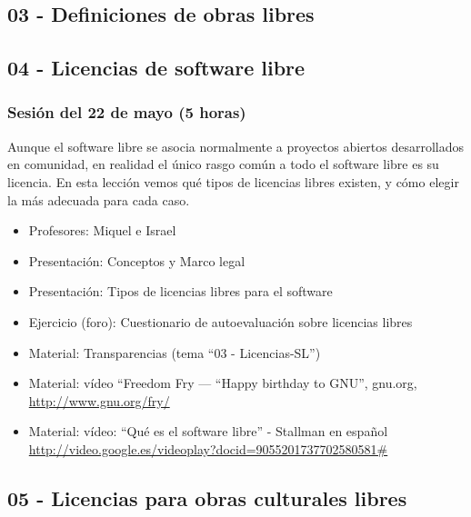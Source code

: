 \documentclass[a4paper,12pt]{article}
\begin{document}
\subsection{03 - Definiciones de obras libres}

\subsection{04 - Licencias de software libre}

\subsubsection{Sesión del 22 de mayo (5 horas)}

Aunque el software libre se asocia normalmente a proyectos abiertos desarrollados en comunidad, en realidad el único rasgo común a todo el software libre es su licencia. En esta lección vemos qué tipos de licencias libres existen, y cómo elegir la más adecuada para cada caso. 

 \begin{itemize}
 \item Profesores: Miquel e Israel
 \item Presentación: Conceptos y Marco legal 
 \item Presentación: Tipos de licencias libres para el software 
 \item Ejercicio (foro): Cuestionario de autoevaluación sobre licencias libres \\
 \item Material: Transparencias (tema ``03 - Licencias-SL'')
 \item Material: vídeo ``Freedom Fry — “Happy birthday to GNU'', gnu.org, \\
   \url{http://www.gnu.org/fry/}
 \item Material: vídeo: ``Qué es el software libre'' - Stallman en español
\url{http://video.google.es/videoplay?docid=9055201737702580581#}
 \end{itemize}

\subsection{05 - Licencias para obras culturales libres}
\end{document}

